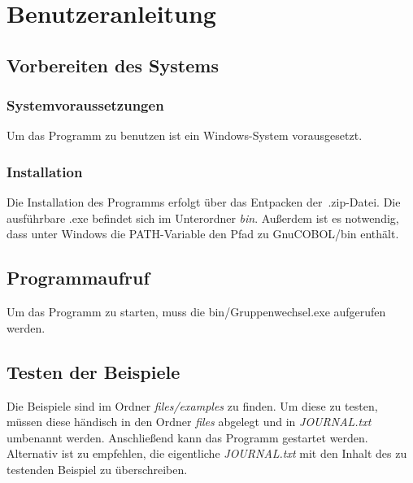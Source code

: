 \chapter{Benutzeranleitung}\label{ch:benutzeranleitung}


\section{Vorbereiten des Systems}\label{sec:vorbereiten-des-systems}

\subsection{Systemvoraussetzungen}\label{subsec:systemvoraussetzungen}
Um das Programm zu benutzen ist ein Windows-System vorausgesetzt.

\subsection{Installation}\label{subsec:installation}
Die Installation des Programms erfolgt über das Entpacken der~.zip-Datei.
Die ausführbare .exe befindet sich im Unterordner \textit{bin}.
Außerdem ist es notwendig, dass unter Windows die PATH-Variable den Pfad zu GnuCOBOL/bin enthält.

\section{Programmaufruf}\label{sec:programmaufruf}
Um das Programm zu starten, muss die bin/Gruppenwechsel.exe aufgerufen werden.

\section{Testen der Beispiele}\label{sec:testen-der-beispiele}
Die Beispiele sind im Ordner \textit{files/examples} zu finden. Um diese zu testen, müssen diese händisch in den Ordner \textit{files} abgelegt und in \textit{JOURNAL.txt} umbenannt werden. Anschließend kann das Programm gestartet werden.
Alternativ ist zu empfehlen, die eigentliche \textit{JOURNAL.txt} mit den Inhalt des zu testenden Beispiel zu überschreiben.